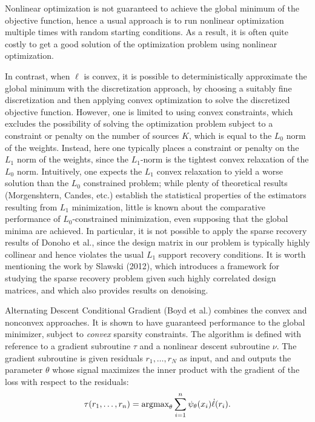 \documentclass[11pt]{article}
\begin{document}
Nonlinear optimization is not guaranteed to achieve the global minimum
of the objective function, hence a usual approach is to run nonlinear
optimization multiple times with random starting conditions.  As a
result, it is often quite costly to get a good solution of the
optimization problem using nonlinear optimization.

In contrast, when $\ell$ is convex, it is possible to
deterministically approximate the global minimum with the
discretization approach, by choosing a suitably fine discretization
and then applying convex optimization to solve the discretized
objective function.  However, one is limited to using convex
constraints, which excludes the possibility of solving the
optimization problem subject to a constraint or penalty on the number
of sources $K$, which is equal to the $L_0$ norm of the weights.
Instead, here one typically places a constraint or penalty on the
$L_1$ norm of the weights, since the $L_1$-norm is the tightest convex
relaxation of the $L_0$ norm.  Intuitively, one expects the $L_1$
convex relaxation to yield a worse solution than the $L_0$ constrained
problem; while plenty of theoretical results (Morgenshtern, Candes,
etc.) establish the statistical properties of the estimators resulting
from $L_1$ minimization, little is known about the comparative
performance of $L_0$-constrained minimization, even supposing that the
global minima are achieved.  In particular, it is not possible to
apply the sparse recovery results of Donoho et al., since the design
matrix in our problem is typically highly collinear and hence violates
the usual $L_1$ support recovery conditions.  It is worth mentioning
the work by Slawski (2012), which introduces a framework for studying
the sparse recovery problem given such highly correlated design
matrices, and which also provides results on denoising.

Alternating Descent Conditional Gradient (Boyd et al.) combines the
convex and nonconvex approaches.  It is shown to have guaranteed
performance to the global minimizer, subject to \emph{convex} sparsity
constraints.  The algorithm is defined with reference to a gradient
subroutine $\tau$ and a nonlinear descent subroutine $\nu$.  The
gradient subroutine is given residuals $r_1,\hdots, r_N$ as input, and
and outputs the parameter $\theta$ whose signal maximizes the inner
product with the gradient of the loss with respect to the residuals:
\[
\tau(r_1,\hdots, r_n) = \text{argmax}_\theta \sum_{i=1}^n \psi_\theta(x_i) \dot{\ell}(r_i).
\]
\end{document}
